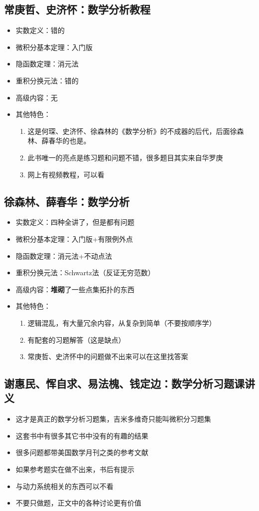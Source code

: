 \documentclass[UTF8]{article}
\begin{document}
    \subsection{常庚哲、史济怀：数学分析教程}
    \begin{itemize}
        \item 实数定义：错的
        \item 微积分基本定理：入门版
        \item 隐函数定理：消元法
        \item 重积分换元法：错的
        \item 高级内容：无
        \item 其他特色：\begin{enumerate}
            \item 这是何琛、史济怀、徐森林的《数学分析》的不成器的后代，后面徐森林、薛春华的也是。
            \item 此书唯一的亮点是练习题和问题不错，很多题目其实来自华罗庚
            \item 网上有视频教程，可以看
        \end{enumerate}
    \end{itemize}
    \subsection{徐森林、薛春华：数学分析}
    \begin{itemize}
        \item 实数定义：四种全讲了，但是都有问题
        \item 微积分基本定理：入门版+有限例外点
        \item 隐函数定理：消元法+不动点法
        \item 重积分换元法：Schwartz法（反证无穷范数）
        \item 高级内容：\textbf{堆砌}了一些点集拓扑的东西
        \item 其他特色：\begin{enumerate}
            \item 逻辑混乱，有大量冗余内容，从复杂到简单（不要按顺序学）
            \item 有配套的习题解答（这是缺点）
            \item 常庚哲、史济怀中的问题做不出来可以在这里找答案
        \end{enumerate}
    \end{itemize}
    \subsection{谢惠民、恽自求、易法槐、钱定边：数学分析习题课讲义}
    \begin{itemize}
        \item 这才是真正的数学分析习题集，吉米多维奇只能叫微积分习题集
        \item 这套书中有很多其它书中没有的有趣的结果
        \item 很多问题都带美国数学月刊之类的参考文献
        \item 如果参考题实在做不出来，书后有提示
        \item 与动力系统相关的东西可以不看
        \item 不要只做题，正文中的各种讨论更有价值
    \end{itemize}
\end{document}
